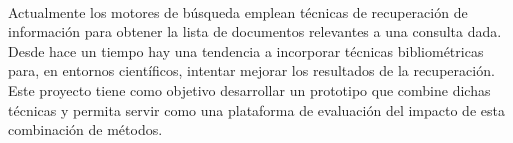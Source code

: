 \chapter*{}


%



\cleardoublepage
\thispagestyle{empty}

\begin{center}
{\large\bfseries \myTitle}\\
\end{center}
\begin{center}
\myName\\
\end{center}

\\

\vspace{0.7cm}
\\

Actualmente los motores de búsqueda emplean técnicas de recuperación de información para obtener la lista de documentos relevantes a una consulta dada. Desde hace un tiempo hay una tendencia a incorporar técnicas bibliométricas para, en entornos científicos, intentar mejorar los resultados de la recuperación. Este proyecto tiene como objetivo desarrollar un prototipo que combine dichas técnicas y permita servir como una plataforma de evaluación del impacto de esta combinación de métodos.
\cleardoublepage



